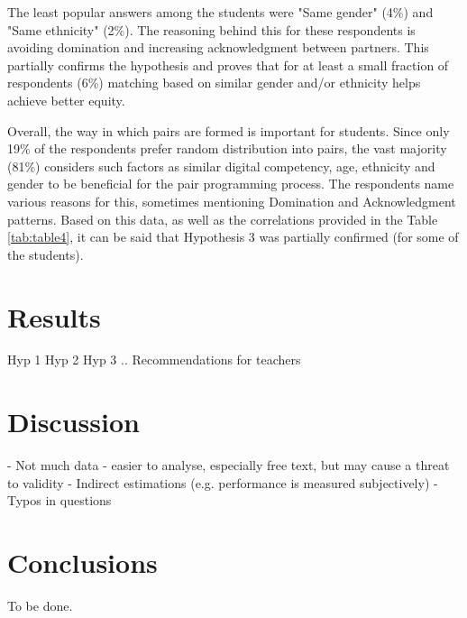 \documentclass[conference]{IEEEtran}
\begin{document}
The least popular answers among the students were "Same gender" (4\%) and "Same ethnicity" (2\%). The reasoning behind this for these respondents is avoiding domination and increasing acknowledgment between partners. This partially confirms the hypothesis and proves that for at least a small fraction of respondents (6\%) matching based on similar gender and/or ethnicity helps achieve better equity.

Overall, the way in which pairs are formed is important for students. Since only 19\% of the respondents prefer random distribution into pairs, the vast majority (81\%) considers such factors as similar digital competency, age, ethnicity and gender to be beneficial for the pair programming process. The respondents name various reasons for this, sometimes mentioning Domination and Acknowledgment patterns. Based on this data, as well as the correlations provided in the Table \ref{tab:table4}, it can be said that Hypothesis 3 was partially confirmed (for some of the students).

\section{Results}
Hyp 1
Hyp 2
Hyp 3
..
Recommendations for teachers

\section{Discussion}
- Not much data - easier to analyse, especially free text, but may cause a threat to validity
- Indirect estimations (e.g. performance is measured subjectively)
- Typos in questions

\section{Conclusions}
To be done.
\end{document}
